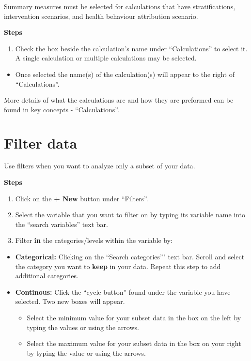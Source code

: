 \documentclass[]{book}
\providecommand{\tightlist}{%
  \setlength{\itemsep}{0pt}\setlength{\parskip}{0pt}}
\begin{document}
Summary measures must be selected for calculations that have stratifications, intervention scenarios, and health behaviour attribution scenario.

\textbf{Steps}

\begin{enumerate}
\def\labelenumi{\arabic{enumi}.}
\tightlist
\item
  Check the box beside the calculation's name under ``Calculations'' to select it. A single calculation or multiple calculations may be selected.
\end{enumerate}

\begin{itemize}
\tightlist
\item
  Once selected the name(s) of the calculation(s) will appear to the right of ``Calculations''.
\end{itemize}

More details of what the calculations are and how they are preformed can be found in \protect\hyperlink{keyconcepts}{key concepts} - ``Calculations''.

\hypertarget{filter-data}{%
\section{Filter data}\label{filter-data}}

Use filters when you want to analyze only a subset of your data.

\textbf{Steps}

\begin{enumerate}
\def\labelenumi{\arabic{enumi}.}
\item
  Click on the \textbf{+ New} button under ``Filters''.
\item
  Select the variable that you want to filter on by typing its variable name into the ``search variables'' text bar.
\item
  Filter \textbf{in} the categories/levels within the variable by:
\end{enumerate}

\begin{itemize}
\item
  \textbf{Categorical:} Clicking on the ``Search categories''" text bar. Scroll and select the category you want to \textbf{keep} in your data. Repeat this step to add additional categories.
\item
  \textbf{Continous:} Click the ``cycle button'' found under the variable you have selected. Two new boxes will appear.

  \begin{itemize}
  \tightlist
  \item
    Select the minimum value for your subset data in the box on the left by typing the values or using the arrows.
  \item
    Select the maximum value for your subset data in the box on your right by typing the value or using the arrows.
  \end{itemize}
\end{itemize}
\end{document}
